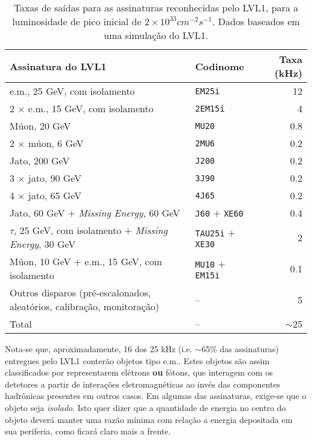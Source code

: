 \begin{table}
\caption{Taxas de saídas para as assinaturas reconhecidas pelo LVL1,
para a luminosidade de pico inicial de $2\times10^{33}cm^{-2}s^{-1}$. Dados
baseados em uma simulação do LVL1.}
\label{tab:l1-rates}
\begin{center}
\begin{sideways}
\begin{tabular}{|l|l|r|}
\hline
\textbf{Assinatura do LVL1} & \textbf{Codinome} & \textbf{Taxa (kHz)} \\ \hline
e.m., 25 GeV, com isolamento & \texttt{EM25i} & 12 \\ \hline
2 $\times$ e.m., 15 GeV, com isolamento & \texttt{2EM15i} & 4 \\ \hline
Múon, 20 GeV & \texttt{MU20} & 0.8 \\ \hline
2 $\times$ múon, 6 GeV & \texttt{2MU6} & 0.2 \\ \hline
Jato, 200 GeV & \texttt{J200} & 0.2 \\ \hline
3 $\times$ jato, 90 GeV & \texttt{3J90} & 0.2 \\ \hline
4 $\times$ jato, 65 GeV & \texttt{4J65} & 0.2 \\ \hline
Jato, 60 GeV $+$ \textit{Missing Energy}, 60 GeV & \texttt{J60} $+$
\texttt{XE60} & 0.4 \\ \hline
$\tau$, 25 GeV, com isolamento $+$ \textit{Missing Energy}, 30 GeV &
\texttt{TAU25i} $+$ \texttt{XE30} & 2 \\
\hline
Múon, 10 GeV $+$ e.m., 15 GeV, com isolamento & \texttt{MU10} $+$ \texttt{EM15i} & 0.1 \\ \hline
Outros disparos (pré-escalonados, aleatórios, calibração, monitoração) & -- & 5 \\
\hline
Total & -- & $\sim$25 \\ \hline
\end{tabular}
\end{sideways}
\end{center}
\end{table}

Nota-se que, aproximadamente, 16 dos 25 kHz (i.e. $\sim$65\% das assinaturas)
entregues pelo LVL1 conterão objetos tipo e.m.. Estes objetos são assim
classificados por representarem elétrons \textbf{ou} fótons, que interagem com
os detetores a partir de interações eletromagnéticas ao invés das componentes
hadrônicas presentes em outros casos. Em algumas das assinaturas, exige-se que
o objeto seja \emph{isolado}. Isto quer dizer que a quantidade de energia no
centro do objeto deverá manter uma razão mínima com relação a energia
depositada em sua periferia, como ficará claro mais a frente.

